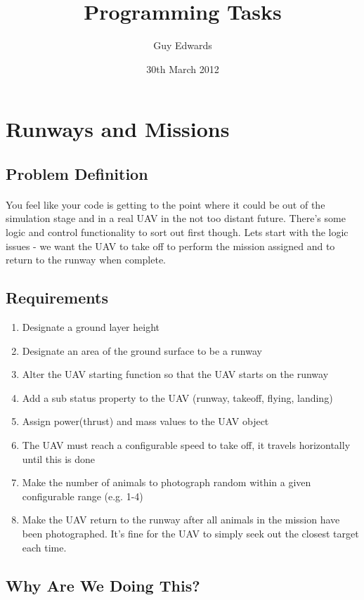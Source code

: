 \documentclass[11pt]{book}
\title{\textbf{Programming Tasks}}
\author{Guy Edwards}
\date{30th March 2012}
\begin{document}
\section{Runways and Missions}

\subsection{Problem Definition}

\paragraph{} You feel like your code is getting to the point where it could be
out of the simulation stage and in a real UAV in the not too distant future.
There's some logic and control functionality to sort out first though. Lets
start with the logic issues - we want the UAV to take off to perform the
mission assigned and to return to the runway when complete.

\subsection{Requirements}

\begin{enumerate}
\item Designate a ground layer height
\item Designate an area of the ground surface to be a runway
\item Alter the UAV starting function so that the UAV starts on the runway
\item Add a sub status property to the UAV (runway, takeoff, flying, landing)
\item Assign power(thrust) and mass values to the UAV object
\item The UAV must reach a configurable speed to take off, it travels horizontally until this is done
\item Make the number of animals to photograph random within a given configurable range (e.g. 1-4)
\item Make the UAV return to the runway after all animals in the mission have been photographed. It's fine for the UAV to simply seek out the closest target each time.
\end{enumerate}

\subsection{Why Are We Doing This?}
\end{document}
